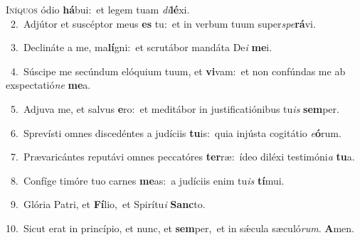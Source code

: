 \lettrine{\initial\textcolor{\initialcolor}{I}}{níquos} ódio \textbf{há}\-bui:~\star et legem tuam \textit{di}\-\textbf{lé}xi.\\
{\numbfont\textcolor{\numbcolor}{~2.}}~Adjútor et suscéptor meus \textbf{es} tu:~\star et in verbum tuum super\-\textit{spe}\-\textbf{rá}vi.\par
{\numbfont\textcolor{\numbcolor}{~3.}}~Declináte a me, ma\-\textbf{lí}\-gni:~\star et scrutábor mandáta De\textit{i} \textbf{me}\-i.\par
{\numbfont\textcolor{\numbcolor}{~4.}}~Súscipe me secúndum elóquium tuum, et \textbf{vi}\-vam:~\star et non confúndas me ab exspectatió\textit{ne} \textbf{me}\-a.\par
{\numbfont\textcolor{\numbcolor}{~5.}}~Adjuva me, et salvus \textbf{e}\-ro:~\star et meditábor in justificatiónibus tu\textit{is} \textbf{sem}\-per.\par
{\numbfont\textcolor{\numbcolor}{~6.}}~Sprevísti omnes discedéntes a judíciis \textbf{tu}\-is:~\star quia injústa cogitátio \textit{e}\-\textbf{ó}rum.\par
{\numbfont\textcolor{\numbcolor}{~7.}}~Prævaricántes reputávi omnes peccatóres \textbf{ter}\-ræ:~\star ídeo diléxi testimóni\textit{a} \textbf{tu}\-a.\par
{\numbfont\textcolor{\numbcolor}{~8.}}~Confíge timóre tuo carnes \textbf{me}\-as:~\star a judíciis enim tu\textit{is} \textbf{tí}\-mui.\par
{\numbfont\textcolor{\numbcolor}{~9.}}~Glória Patri, et \textbf{Fí}\-lio,~\star et Spirítu\textit{i} \textbf{Sanc}\-to.\par
{\numbfont\textcolor{\numbcolor}{10.}}~Sicut erat in princípio, et nunc, et \textbf{sem}\-per,~\star et in sǽcula sæculó\-\textit{rum}\-. \textbf{A}\-men.\par

